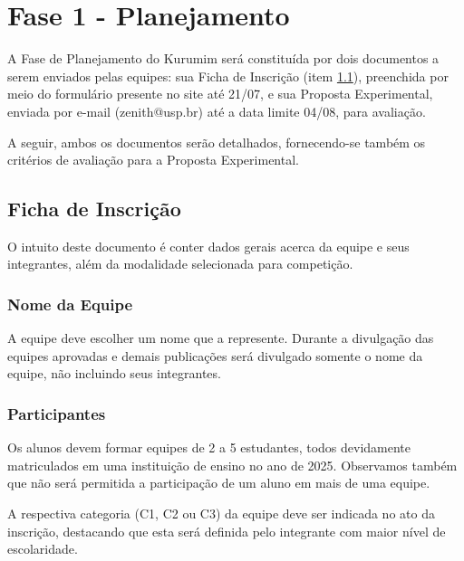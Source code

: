 \section{Fase 1 - Planejamento}\label{sec:planejamento}
    \par A Fase de Planejamento do Kurumim será constituída por dois documentos a serem 
    enviados pelas equipes: sua Ficha de Inscrição (item \ref{sec:ficha_inscricao}), preenchida por meio do formulário 
    presente no site até 21/07, e sua Proposta Experimental, enviada por e-mail (zenith@usp.br) 
    até a data limite 04/08, para avaliação.

    A seguir, ambos os documentos serão detalhados, fornecendo-se também os critérios de avaliação para a Proposta Experimental.

    \subsection{Ficha de Inscrição}\label{sec:ficha_inscricao}
        O intuito deste documento é conter dados gerais acerca da equipe e seus integrantes, além da modalidade selecionada para competição.
    
        \subsubsection{Nome da Equipe}
            A equipe deve escolher um nome que a represente. Durante a divulgação das equipes aprovadas e demais publicações será divulgado somente o nome da equipe, não incluindo seus integrantes.
            
        \subsubsection{Participantes}
            Os alunos devem formar equipes de 2 a 5 estudantes, todos 
            devidamente matriculados em uma instituição de ensino no ano de 2025. Observamos também que não será permitida a participação de um aluno em mais de uma equipe.

            A respectiva categoria (C1, C2 ou C3) da equipe deve ser indicada no ato da inscrição, destacando que esta será definida pelo integrante com maior nível de escolaridade. 
                
    
